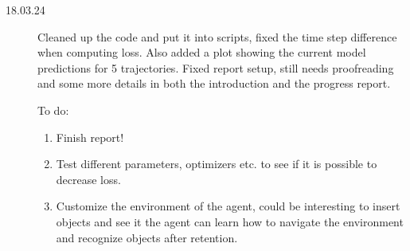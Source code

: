 \begin{description}
    \item[18.03.24] Cleaned up the code and put it into scripts, fixed the time step difference when computing loss. Also added a plot showing the current model predictions for 5 trajectories. Fixed report setup, still needs proofreading and some more details in both the introduction and the progress report.

    To do: %
    \begin{enumerate}
        \item Finish report!
        \item Test different parameters, optimizers etc. to see if it is possible to decrease loss. 
        \item Customize the environment of the agent, could be interesting to insert objects and see it the agent can learn how to navigate the environment and recognize objects after retention.
    \end{enumerate}
\end{description}
